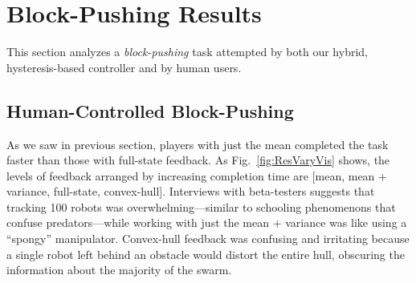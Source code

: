 
\section{Block-Pushing Results}\label{sec:exp}

This section analyzes a \emph{block-pushing} task attempted by both our hybrid, hysteresis-based controller and by human users.  

\subsection{Human-Controlled Block-Pushing}



As we saw in previous section, players with just the mean completed the task faster than those with full-state feedback.  As Fig.~\ref{fig:ResVaryVis} shows, the levels of feedback arranged by increasing completion time are [mean, mean + variance, full-state, convex-hull].  Interviews with  beta-testers suggests that tracking 100 robots was overwhelming---similar to schooling phenomenons that confuse predators---while working with just the mean + variance was like using a ``spongy'' manipulator. Convex-hull feedback was confusing and irritating because a single robot left behind an obstacle would distort the entire hull, obscuring the information about the majority of the swarm.


